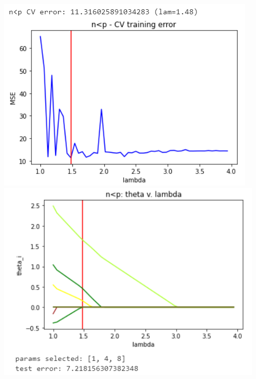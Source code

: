 \documentclass[11pt]{article}
\begin{document}
\begin{center}
\includegraphics[scale=0.7]{charts/lasso_ortho_n_lt_p_err.PNG}
\includegraphics[scale=0.7]{charts/lasso_ortho_n_lt_p_thetas.PNG}


\end{center}
\end{document}
